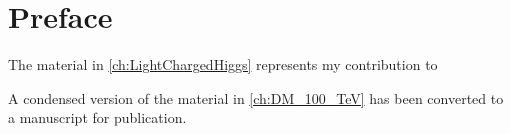 \chapter*{Preface}

The material in \autoref{ch:LightChargedHiggs} represents my contribution to 

A condensed version of the material in \autoref{ch:DM_100_TeV} has been converted to a manuscript for publication. 
